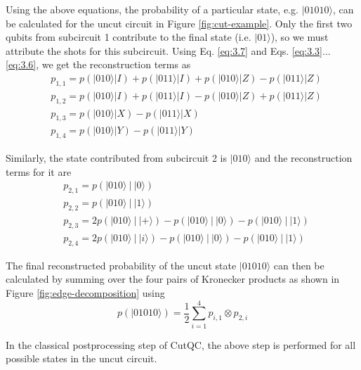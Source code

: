 Using the above equations, the probability of a particular state, e.g. $|01010\rangle$, can be calculated for the uncut circuit in Figure \ref{fig:cut-example}. Only the first two qubits from subcircuit 1 contribute to the final state (i.e. $|01\rangle$), so we must attribute the shots for this subcircuit. Using Eq. \ref{eq:3.7} and Eqs. \ref{eq:3.3}...\ref{eq:3.6}, we get the reconstruction terms as 
\begin{equation*}
\begin{split}
    & p_{1,1} = p(|010\rangle | I) + p(|011\rangle | I) + p(|010\rangle | Z) - p(|011\rangle | Z) \\
    & p_{1,2} = p(|010\rangle | I) + p(|011\rangle | I) - p(|010\rangle | Z) + p(|011\rangle | Z) \\
    & p_{1,3} = p(|010\rangle | X) - p(|011\rangle | X) \\
    & p_{1,4} = p(|010\rangle | Y) - p(|011\rangle | Y)
\end{split}
\end{equation*}

\noindent Similarly, the state contributed from subcircuit 2 is $|010\rangle$ and the reconstruction terms for it are
\begin{equation*}
\begin{split}
    & p_{2,1} = p(|010\rangle\ |\ |0\rangle) \\
    & p_{2,2} = p(|010\rangle\ |\ |1\rangle) \\
    & p_{2,3} = 2p(|010\rangle\ |\ |+\rangle) - p(|010\rangle\ |\ |0\rangle) - p(|010\rangle\ |\ |1\rangle) \\
    & p_{2,4} = 2p(|010\rangle\ |\ |i\rangle) - p(|010\rangle\ |\ |0\rangle) - p(|010\rangle\ |\ |1\rangle)
\end{split}
\end{equation*}

\noindent The final reconstructed probability of the uncut state $|01010\rangle$ can then be calculated by summing over the four pairs of Kronecker products as shown in Figure \ref{fig:edge-decomposition} using
\begin{equation*}
    p(|01010\rangle) = \frac{1}{2} \sum^{4}_{i=1} p_{i,1} \otimes p_{2,i}
\end{equation*}

\noindent In the classical postprocessing step of CutQC, the above step is performed for all possible states in the uncut circuit.







